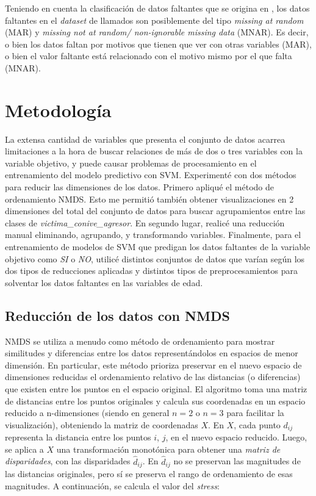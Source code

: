 \documentclass[10 pt]{article}
\begin{document}
Teniendo en cuenta la clasificación de datos faltantes que se origina en \citet{rubin1976inference}, los datos faltantes en el \textit{dataset} de llamados son posiblemente del tipo \textit{missing at random} (MAR) y \textit{missing not at random/ non-ignorable missing data} (MNAR). Es decir, o bien los datos faltan por motivos que tienen que ver con otras variables (MAR), o bien el valor faltante está relacionado con el motivo mismo por el que falta (MNAR).    


\section{Metodología}\label{met}

La extensa cantidad de variables que presenta el conjunto de datos acarrea limitaciones a la hora de buscar relaciones de más de dos o tres variables con la variable objetivo, y puede causar problemas de procesamiento en el entrenamiento del modelo predictivo con SVM. Experimenté con dos métodos para reducir las dimensiones de los datos. Primero apliqué el método de ordenamiento NMDS. Esto me permitió también obtener visualizaciones en 2 dimensiones del total del conjunto de datos para buscar agrupamientos entre las clases de \textit{victima\_conive\_agresor}. En segundo lugar, realicé una reducción manual eliminando, agrupando, y transformando variables. Finalmente, para el entrenamiento de modelos de SVM que predigan los datos faltantes de la variable objetivo como \textit{SI} o \textit{NO}, utilicé distintos conjuntos de datos que varían según los dos tipos de reducciones aplicadas y distintos tipos de preprocesamientos para solventar los datos faltantes en las variables de edad.


\subsection{Reducción de los datos con NMDS}

NMDS se utiliza a menudo como método de ordenamiento para mostrar similitudes y diferencias entre los datos representándolos en espacios de menor dimensión. En particular, este método prioriza preservar en el nuevo espacio de dimensiones reducidas el ordenamiento relativo de las distancias (o diferencias) que existen entre los puntos en el espacio original. 
El algoritmo toma una matriz de distancias entre los puntos originales y calcula sus coordenadas en un espacio reducido a n-dimensiones (siendo en general \(n=2\) o \(n=3\) para facilitar la visualización), obteniendo la matriz de coordenadas \(X\). En \(X\), cada punto \(d_{ij}\) representa la distancia entre los puntos \(i\), \(j\), en el nuevo espacio reducido. Luego, se aplica a \(X\) una transformación monotónica para obtener una \textit{matriz de disparidades}, con las disparidades \(\hat{d}_{ij}\). En \(\hat{d}_{ij}\) no se preservan las magnitudes de las distancias originales, pero sí se preserva el rango de ordenamiento de esas magnitudes. A continuación, se calcula el valor del \textit{stress}: 
\end{document}

